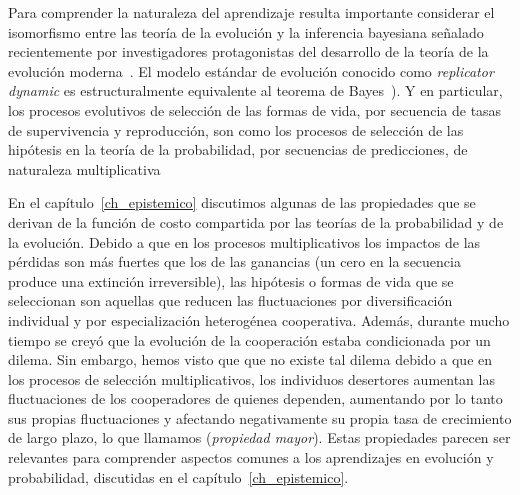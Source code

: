 \documentclass[a4paper,11pt]{book}
\theoremstyle{definition}
\begin{document}

Para comprender la naturaleza del aprendizaje resulta importante considerar el isomorfismo entre las teor\'ia de la evoluci\'on y la inferencia bayesiana se\~nalado recientemente por investigadores protagonistas del desarrollo de la teor\'ia de la evoluci\'on moderna~\cite{czegel2019-bayesianEvolution, czegel2022-bayesDarwin}.
%
El modelo est\'andar de evoluci\'on conocido como \emph{replicator dynamic} \cite{taylor1978-replicatorDynamic} es estructuralmente equivalente al teorema de Bayes~\cite{harper2009-replicatorAsInference,shalizi2009-replicatorAsInference}).
%
Y en particular, los procesos evolutivos de selecci\'on de las formas de vida, por secuencia de tasas de supervivencia y reproducci\'on, son como los procesos de selecci\'on de las hip\'otesis en la teor\'ia de la probabilidad, por secuencias de predicciones, de naturaleza multiplicativa


En el cap\'itulo~\ref{ch_epistemico} discutimos algunas de las propiedades que se derivan de la funci\'on de costo compartida por las teor\'ias de la probabilidad y de la evoluci\'on.
%
Debido a que en los procesos multiplicativos los impactos de las p\'erdidas son m\'as fuertes que los de las ganancias (un cero en la secuencia produce una extinci\'on irreversible), las hip\'otesis o formas de vida que se seleccionan son aquellas que reducen las fluctuaciones por diversificaci\'on individual y por especializaci\'on heterog\'enea cooperativa.
%
Adem\'as, durante mucho tiempo se crey\'o que la evoluci\'on de la cooperaci\'on estaba condicionada por un dilema.
%
Sin embargo, hemos visto que que no existe tal dilema debido a que en los procesos de selecci\'on multiplicativos, los individuos desertores
aumentan las fluctuaciones de los cooperadores de quienes dependen, aumentando por lo tanto sus propias fluctuaciones y afectando negativamente su propia tasa de crecimiento de largo plazo, lo que llamamos (\emph{propiedad mayor}).
%
Estas propiedades parecen ser relevantes para comprender aspectos comunes a los aprendizajes en evoluci\'on y probabilidad, discutidas en el cap\'itulo~\ref{ch_epistemico}.
\end{document}

